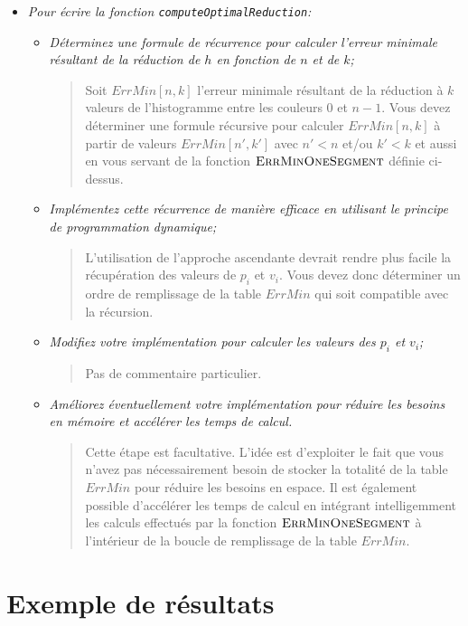 \documentclass[a4paper,10pt]{article}
\begin{document}
\begin{itemize}
\bigskip

\item {\it Pour écrire la fonction \texttt{computeOptimalReduction}:}
\begin{itemize}
\item {\it Déterminez une formule de récurrence pour calculer l'erreur minimale résultant de la réduction de $h$ en fonction de $n$ et de $k$;}

\bigskip

\begin{quote}
Soit $ErrMin[n,k]$ l'erreur minimale résultant de la réduction à $k$
valeurs de l'histogramme entre les couleurs 0 et $n-1$. Vous devez
déterminer une formule récursive pour calculer $ErrMin[n,k]$ à partir
de valeurs $ErrMin[n',k']$ avec $n'<n$ et/ou $k'<k$ et aussi en vous
servant de la fonction $\textnormal{\scshape ErrMinOneSegment}$ définie ci-dessus.
\end{quote}

\bigskip

\item {\it Implémentez cette récurrence de manière efficace en utilisant le principe de programmation dynamique;}

\bigskip

\begin{quote}
L'utilisation de l'approche ascendante devrait rendre plus facile la
récupération des valeurs de $p_i$ et $v_i$. Vous devez donc déterminer un
ordre de remplissage de la table $ErrMin$ qui soit compatible avec la
récursion.
\end{quote}

\bigskip

\item {\it Modifiez votre implémentation pour calculer les valeurs des $p_i$ et $v_i$;}

\bigskip

\begin{quote}
Pas de commentaire particulier.
\end{quote}

\bigskip

\item {\it Améliorez éventuellement votre implémentation pour réduire les
  besoins en mémoire et accélérer les temps de calcul.}

\bigskip

\begin{quote}
Cette étape est facultative. L'idée est d'exploiter le fait que vous
n'avez pas nécessairement besoin de stocker la totalité de la table
$ErrMin$ pour réduire les besoins en espace. Il est également 
possible d'accélérer les temps de calcul en intégrant intelligemment
les calculs effectués par la fonction $\textnormal{\scshape ErrMinOneSegment}$ à
l'intérieur de la boucle de remplissage de la table $ErrMin$.
\end{quote}

\bigskip

\end{itemize}

\end{itemize}

\section*{Exemple de résultats}
\end{document}
